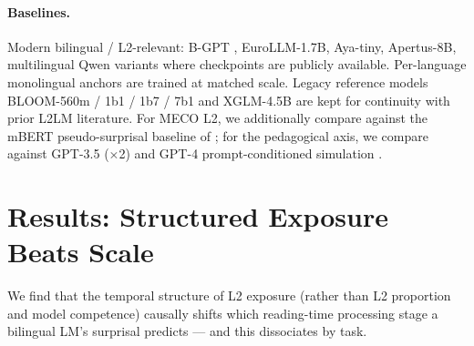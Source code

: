 \documentclass[11pt]{article}
\begin{document}
\paragraph{Baselines.} Modern bilingual / L2-relevant: B-GPT \citep{arnett-etal-2025-acquisition}, EuroLLM-1.7B, Aya-tiny, Apertus-8B, multilingual Qwen variants where checkpoints are publicly available. Per-language monolingual anchors are trained at matched scale. Legacy reference models BLOOM-560m / 1b1 / 1b7 / 7b1 and XGLM-4.5B are kept for continuity with prior L2LM literature. For MECO L2, we additionally compare against the mBERT pseudo-surprisal baseline of \citet{de-varda-marelli-2022-effects}; for the pedagogical axis, we compare against GPT-3.5 ($\times$2) and GPT-4 prompt-conditioned simulation \citep{benedetto-etal-2024-using}.

\section{Results: Structured Exposure Beats Scale}\label{sec:results}

We find that the temporal structure of L2 exposure (rather than L2 proportion and model competence) causally shifts which reading-time processing stage a bilingual LM's surprisal predicts — and this dissociates by task.



\end{document}

